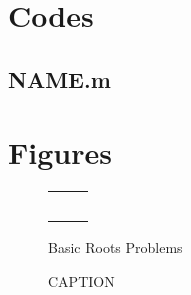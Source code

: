 \documentclass{article}
\begin{document}
\pagebreak

\appendix
\section{Codes}


\subsection{NAME.m}


\pagebreak


\section{Figures}
\begin{figure}[htb!]
\begin{center}
\begin{tabular}{cc}
~
\end{tabular}
\caption{Basic Roots Problems}
\end{center}
\end{figure}


\begin{figure}[htb!]
\begin{center}
\caption{CAPTION}
\end{center}
\end{figure}
\end{document}

